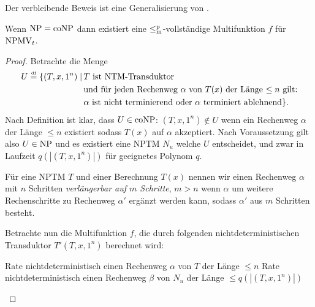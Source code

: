 Der verbleibende Beweis ist eine Generalisierung von \textcite{dingel_separation_2022}.
\begin{theorem}\label{thm:npmvt-vs-npconp}
    Wenn $\mathrm{NP}=\mathrm{coNP}$ dann existiert eine $\leq_\mathrm{m}^\mathrm{p}$-vollständige Multifunktion $f$ für $\mathrm{NPMV}_t$.
\end{theorem}
\begin{proof}
    Betrachte die Menge
\[ \begin{split} U \stackrel{\text{\smash{\tiny df}}}{=}  \{ (T, x, 1^n) \mid \,&\text{$T$ ist NTM-Transduktor} \\ &\text{und für jeden Rechenweg $\alpha$ von $T(x)$ der Länge $\leq n$ gilt:} \\& \text{$\alpha$ ist nicht terminierend oder $\alpha$ terminiert ablehnend} \}. \end{split}  \]
    Nach Definition ist klar, dass $U\in\mathrm{coNP}$: $(T, x, 1^n)\not\in U$ wenn ein Rechenweg $\alpha$ der Länge $\leq n$ existiert sodass $T(x)$ auf $\alpha$ akzeptiert. Nach Voraussetzung gilt also $U\in\mathrm{NP}$ und es existiert eine NPTM $N_u$ welche $U$ entscheidet, und zwar in Laufzeit $q(|(T, x, 1^n)|)$ für geeignetes Polynom $q$.

    Für eine NPTM $T$ und einer Berechnung $T(x)$ nennen wir einen Rechenweg $\alpha$ mit $n$ Schritten \emph{verlängerbar auf $m$ Schritte}, $m>n$ wenn $\alpha$ um weitere Rechenschritte zu Rechenweg $\alpha'$ ergänzt werden kann, sodass $\alpha'$ aus $m$ Schritten besteht.

    Betrachte nun die Multifunktion $f$, die durch folgenden nichtdeterministischen Transduktor $T'(T, x, 1^n)$ berechnet wird:\par
    \begin{algorithm}[H]
        Rate nichtdeterministisch einen Rechenweg $\alpha$ von $T$ der Länge $\leq n$\;
        Rate nichtdeterministisch einen Rechenweg $\beta$ von $N_u$ der Länge $\leq q(|(T, x, 1^n)|)$\;
    \end{algorithm}


\end{proof}
